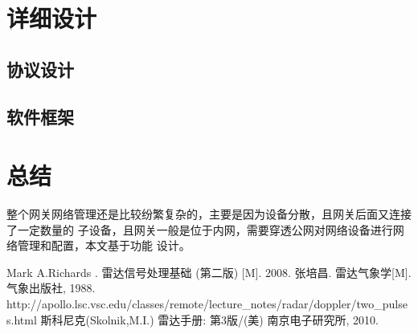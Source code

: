 \documentclass[a4paper,12pt]{report}
\begin{document}
\chapter{详细设计}
\begin{spacing}{1.5}       

\section{协议设计}

\section{软件框架}

\end{spacing}
\chapter{总结}
\begin{spacing}{1.5}       
    整个网关网络管理还是比较纷繁复杂的，主要是因为设备分散，且网关后面又连接了一定数量的
    子设备，且网关一般是位于内网，需要穿透公网对网络设备进行网络管理和配置，本文基于功能
    设计。
\end{spacing}


\begin{thebibliography}{99}
\songti {} 	
    Mark A.Richards . 雷达信号处理基础 (第二版) [M]. 2008.
    张培昌. 雷达气象学[M]. 气象出版社, 1988.
    http://apollo.lsc.vsc.edu/classes/remote/lecture\_notes/radar/doppler/two\_pulses.html
    斯科尼克(Skolnik,M.I.) 雷达手册: 第3版/(美) 南京电子研究所, 2010.

\end{thebibliography}
\end{document}
